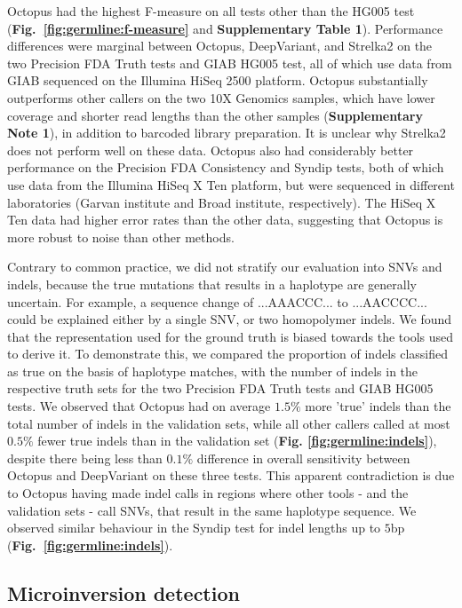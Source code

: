 \documentclass[notitlepage, twocolumn, 10pt]{article}
\begin{document}
Octopus had the highest F-measure on all tests other than the HG005 test (\textbf{Fig.\ \ref{fig:germline:f-measure}} and \textbf{Supplementary Table 1}). Performance differences were marginal between Octopus, DeepVariant, and Strelka2 on the two Precision FDA Truth tests and GIAB HG005 test, all of which use data from GIAB sequenced on the Illumina HiSeq 2500 platform. Octopus substantially outperforms other callers on the two 10X Genomics samples, which have lower coverage and shorter read lengths than the other samples (\textbf{Supplementary Note 1}), in addition to barcoded library preparation. It is unclear why Strelka2 does not perform well on these data. Octopus also had considerably better performance on the Precision FDA Consistency and Syndip tests, both of which use data from the Illumina HiSeq X Ten platform, but were sequenced in different laboratories (Garvan institute and Broad institute, respectively). The HiSeq X Ten data had higher error rates than the other  data, suggesting that Octopus is more robust to noise than other methods.

Contrary to common practice, we did not stratify our evaluation into SNVs and indels, because the true mutations that results in a haplotype are generally uncertain.
For example, a sequence change of ...AAACCC... to ...AACCCC... could be explained either by a single SNV, or two homopolymer indels.
We found that the representation used for the ground truth is biased towards the tools used to derive it. To demonstrate this, we compared the proportion of indels classified as true on the basis of haplotype matches, with the number of indels in the respective truth sets for the two Precision FDA Truth tests and GIAB HG005 tests. We observed that Octopus had on average $1.5\%$ more 'true' indels than the total number of indels in the validation sets, while all other callers called at most $0.5\%$ fewer true indels than in the validation set (\textbf{Fig. \ref{fig:germline:indels}}), despite there being less than $0.1\%$ difference in overall sensitivity between Octopus and DeepVariant on these three tests. This apparent contradiction is due to Octopus having made indel calls in regions where other tools - and the validation sets - call SNVs, that result in the same haplotype sequence. We observed similar behaviour in the Syndip test for indel lengths up to $5$bp (\textbf{Fig.\ \ref{fig:germline:indels}}). 

\subsection*{Microinversion detection}
\end{document}
